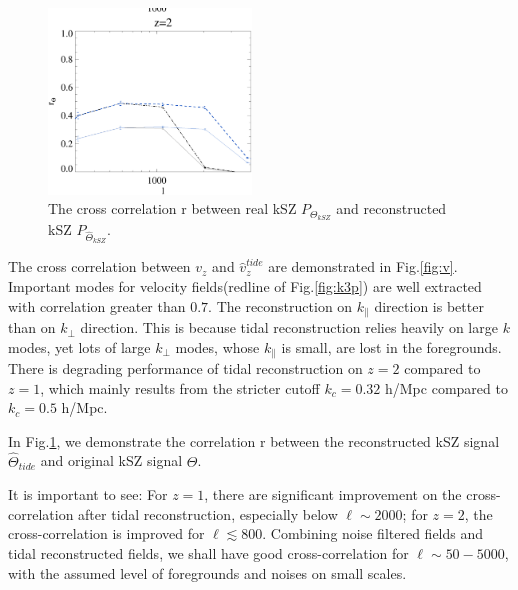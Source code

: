 \begin{figure}[tbp]
\begin{center}
\includegraphics[width=0.48\textwidth]{figure/cl_correlation_z1_z2.eps}
\end{center}
\vspace{-0.7cm}
\caption{The cross correlation r between real kSZ $P_{\Theta_{kSZ}}$ 
and reconstructed kSZ $P_{\hat \Theta_{kSZ}}$.
}
\label{fig:r}
\end{figure}
\label{ssec:tide}
The cross correlation between $v_z$ and $\hat v_z^{tide}$ are demonstrated in Fig.\ref{fig:v}. 
Important modes for velocity fields(redline of Fig.\ref{fig:k3p}) are well extracted with correlation greater than $0.7$. 
The reconstruction on $k_\parallel$ direction is better than on $k_\perp$ direction.
This is because tidal reconstruction relies heavily on large $k$ modes, 
yet lots of large $k_\perp$ modes, whose $k_\parallel$ is small, are lost in the foregrounds. 
There is degrading performance of tidal reconstruction on $z=2$ compared to $z=1$, 
which mainly results from the stricter cutoff $k_c=0.32$ h/Mpc compared to $k_c=0.5$ h/Mpc.

In Fig.\ref{fig:r}, 
we demonstrate the correlation r between the reconstructed kSZ signal $\hat \Theta_{tide}$ and original kSZ signal $\Theta$. 

It is important to see:
For $z=1$, there are significant improvement on the cross-correlation after tidal reconstruction, especially below $\ell \sim 2000$; 
for $z=2$, the cross-correlation is improved for $\ell \lesssim 800$. 
Combining noise filtered fields and tidal reconstructed fields, we shall have good cross-correlation for $\ell  \sim 50-5000$, 
with the assumed level of foregrounds and noises on small scales.


